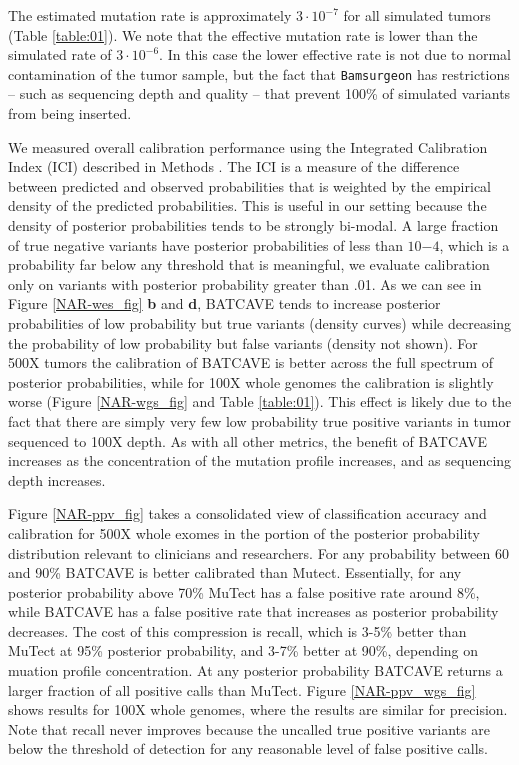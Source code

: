 \documentclass[a4,center,fleqn]{NAR}
\newcommand{\batcave}{BATCAVE }
\begin{document}
The estimated mutation rate is approximately $3\cdot10^{-7}$ for all simulated tumors (Table \ref{table:01}).
We note that the effective mutation rate is lower than the simulated rate of $3\cdot10^{-6}$.
In this case the lower effective rate is not due to normal contamination of the tumor sample, but the fact that \texttt{Bamsurgeon} has restrictions -- such as sequencing depth and quality -- that prevent 100\% of simulated variants from being inserted. 

We measured overall calibration performance using the Integrated Calibration Index (ICI) described in Methods \citep{Austin2019}.
The ICI is a measure of the difference between predicted and observed probabilities that is weighted by the empirical density of the predicted probabilities.
This is useful in our setting because the density of posterior probabilities tends to be strongly bi-modal.
A large fraction of true negative variants have posterior probabilities of less than $10{-4}$, which is a probability far below any threshold that is meaningful, we evaluate calibration only on variants with posterior probability greater than .01.
As we can see in Figure \ref{NAR-wes_fig} \textbf{b} and \textbf{d}, \batcave tends to increase posterior probabilities of low probability but true variants (density curves) while decreasing the probability of low probability but false variants (density not shown).
For 500X tumors the calibration of \batcave is better across the full spectrum of posterior probabilities, while for 100X whole genomes the calibration is slightly worse (Figure \ref{NAR-wgs_fig} and Table \ref{table:01}).
This effect is likely due to the fact that there are simply very few low probability true positive variants in tumor sequenced to 100X depth.
As with all other metrics, the benefit of \batcave increases as the concentration of the mutation profile increases, and as sequencing depth increases.

Figure \ref{NAR-ppv_fig} takes a consolidated view of classification accuracy and calibration for 500X whole exomes in the portion of the posterior probability distribution relevant to clinicians and researchers.
For any probability between 60 and 90\% \batcave is better calibrated than Mutect.
Essentially, for any posterior probability above 70\% MuTect has a false positive rate around 8\%, while \batcave has a false positive rate that increases as posterior probability decreases.
The cost of this compression is recall, which is 3-5\% better than MuTect at 95\% posterior probability, and 3-7\% better at 90\%, depending on muation profile concentration.
At any posterior probability \batcave returns a larger fraction of all positive calls than MuTect.
Figure \ref{NAR-ppv_wgs_fig} shows results for 100X whole genomes, where the results are similar for precision.
Note that recall never improves because the uncalled true positive variants are below the threshold of detection for any reasonable level of false positive calls.
\end{document}
